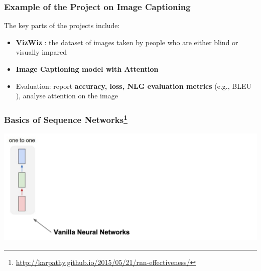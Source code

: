 \documentclass[aspectratio=1610]{beamer} %
\begin{document}
\begin{frame}

\frametitle{Example of the Project on Image Captioning}

\begin{center}
\end{center}

The key parts of the projects include:

\begin{itemize}
\item \textbf{VizWiz} \citep{Gurari2020CaptioningIT}: the dataset of images taken by people who are either blind or visually impared
\pause
\item \textbf{Image Captioning model with Attention} \citep{xu2015}
\pause
\item Evaluation: report \textbf{accuracy, loss, NLG evaluation metrics} (e.g., BLEU \citep{papineni2002}), analyse attention on the image

\end{itemize}

\end{frame}




\begin{frame}

\frametitle{Basics of Sequence Networks\footnote{\url{http://karpathy.github.io/2015/05/21/rnn-effectiveness/}}}

\begin{center}
\includegraphics[width=\textwidth]{pics/vanillarnn}
\end{center}

\end{frame}
\end{document}
